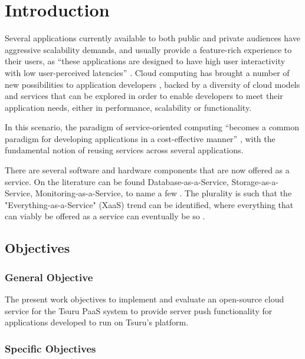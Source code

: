 \section{Introduction} \label{section-introduction}

Several applications currently available to both public and private audiences have aggressive scalability demands, and usually provide a feature-rich experience to their users, as ``these applications are designed to have high user interactivity with low user-perceived latencies'' \cite{estep2013mobile}. Cloud computing has brought a number of new possibilities to application developers \cite{garcia2012challenges}, backed by a diversity of cloud models and services that can be explored in order to enable developers to meet their application needs, either in performance, scalability or functionality.

In this scenario, the paradigm of service-oriented computing ``becomes a common paradigm for developing applications in a cost-effective manner'' \cite{la2013framework}, with the fundamental notion of reusing services across several applications.

There are several software and hardware components that are now offered as a service. On the literature can be found Database-as-a-Service, Storage-as-a-Service, Monitoring-as-a-Service, to name a few \cite{kachele2013beyond,duan2015everything,sharma2015evolution}. The plurality is such that the "Everything-as-a-Service" (XaaS) trend can be identified, where everything that can viably be offered as a service can eventually be so \cite{duan2015everything}.


\subsection{Objectives}

\subsubsection{General Objective}

The present work objectives to implement and evaluate an open-source cloud service for the Tsuru PaaS system to provide server push functionality for applications developed to run on Tsuru's platform.

\subsubsection{Specific Objectives}

